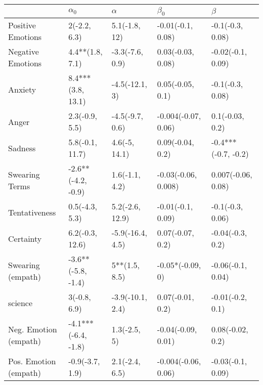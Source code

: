 \begin{tabular}{lllll}
\toprule
{} &           $\alpha_0$ &          $\alpha$ &            $\beta_0$ &              $\beta$ \\
\midrule
Positive Emotions     &         2(-2.2, 6.3) &     5.1(-1.8, 12) &    -0.01(-0.1, 0.08) &     -0.1(-0.3, 0.08) \\
Negative Emotions     &      4.4**(1.8, 7.1) &   -3.3(-7.6, 0.9) &    0.03(-0.03, 0.08) &    -0.02(-0.1, 0.09) \\
Anxiety               &    8.4***(3.8, 13.1) &    -4.5(-12.1, 3) &     0.05(-0.05, 0.1) &     -0.1(-0.3, 0.08) \\
Anger                 &       2.3(-0.9, 5.5) &   -4.5(-9.7, 0.6) &  -0.004(-0.07, 0.06) &      0.1(-0.03, 0.2) \\
Sadness               &      5.8(-0.1, 11.7) &     4.6(-5, 14.1) &     0.09(-0.04, 0.2) &  -0.4***(-0.7, -0.2) \\
Swearing Terms        &   -2.6**(-4.2, -0.9) &    1.6(-1.1, 4.2) &  -0.03(-0.06, 0.008) &   0.007(-0.06, 0.08) \\
Tentativeness         &       0.5(-4.3, 5.3) &   5.2(-2.6, 12.9) &    -0.01(-0.1, 0.09) &     -0.1(-0.3, 0.06) \\
Certainty             &      6.2(-0.3, 12.6) &  -5.9(-16.4, 4.5) &     0.07(-0.07, 0.2) &     -0.04(-0.3, 0.2) \\
Swearing (empath)     &   -3.6**(-5.8, -1.4) &     5**(1.5, 8.5) &     -0.05*(-0.09, 0) &    -0.06(-0.1, 0.04) \\
science               &         3(-0.8, 6.9) &  -3.9(-10.1, 2.4) &     0.07(-0.01, 0.2) &     -0.01(-0.2, 0.1) \\
Neg. Emotion (empath) &  -4.1***(-6.4, -1.8) &      1.3(-2.5, 5) &   -0.04(-0.09, 0.01) &     0.08(-0.02, 0.2) \\
Pos. Emotion (empath) &      -0.9(-3.7, 1.9) &    2.1(-2.4, 6.5) &  -0.004(-0.06, 0.06) &    -0.03(-0.1, 0.09) \\
\bottomrule
\end{tabular}
